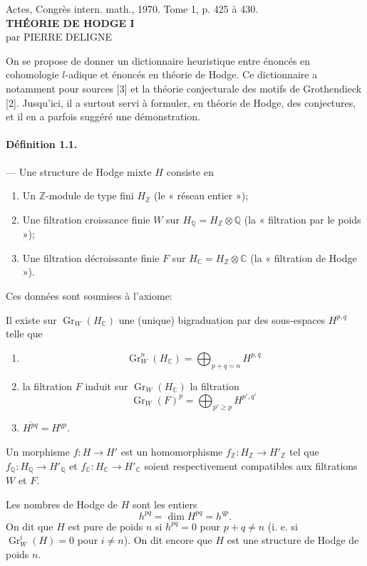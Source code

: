 \documentclass[10pt]{article}
\newcommand{\C}{\mathbb C}
\newcommand{\Q}{\mathbb Q}
\newcommand{\Z}{\mathbb Z}
\newcommand{\Gr}{\operatorname{Gr}}
\begin{document}
\begin{center}
{\small Actes, Congrès intern. math., 1970. Tome 1, p. 425 à 430.}\\[4em]
{\Large\bfseries THÉORIE DE HODGE I}\\[1.6em]
{\large par PIERRE DELIGNE}
\end{center}

On se propose de donner un dictionnaire heuristique entre énoncés en cohomologie $l$-adique et énoncés en théorie de Hodge. Ce dictionnaire a notamment pour sources [3] et la théorie conjecturale des motifs de Grothendieck [2]. Jusqu'ici, il a surtout servi à formuler, en théorie de Hodge, des conjectures, et il en a parfois suggéré une démonstration.

\paragraph{Définition 1.1.} — Une structure de Hodge mixte $H$ consiste en
\begin{enumerate}[label=(\alph*)]
\item Un $\Z$-module de type fini $H_\Z$ (le « réseau entier »);
\item Une filtration croissance finie $W$ sur $H_\Q=H_\Z\otimes\Q$ (la « filtration par le poids »); %
\item Une filtration décroissante finie $F$ sur $H_\C=H_\Z\otimes\C$ (la « filtration de Hodge »).
\end{enumerate}
Ces données sont soumises à l'axiome:

Il existe sur $\Gr_W(H_\C)$ une (unique) bigraduation par des sous-espaces $H^{p,q}$ telle que
\begin{enumerate}[label=(\roman*)]
\item
\[
\Gr_W^n(H_\C)=\bigoplus_{p+q=n}H^{p,q}
\]
\item la filtration $F$ induit sur $\Gr_W(H_\C)$ la filtration
\[
\Gr_W(F)^p=\bigoplus_{p'\ge p}H^{p',q'}
\]
\item $\overline{H^{pq}}=H^{qp}$.
\end{enumerate}
Un morphisme $f:H\to H'$ est un homomorphisme $f_\Z:H_\Z\to H'_\Z$ tel que $f_\Q:H_\Q\to H'_\Q$ et $f_\C:H_\C\to H'_\C$ soient respectivement compatibles aux filtrations $W$ et $F$.

Les nombres de Hodge de $H$ sont les entiers
\[
\tag{1.2}
h^{pq}=\dim H^{pq}=h^{qp}.
\]
On dit que $H$ est pure de poids $n$ si $h^{pq}=0$ pour $p+q\ne n$ (i. e. si $\Gr_W^i(H)=0$ pour $i\ne n$). On dit encore que $H$ est une structure de Hodge de poids $n$.
\end{document}
